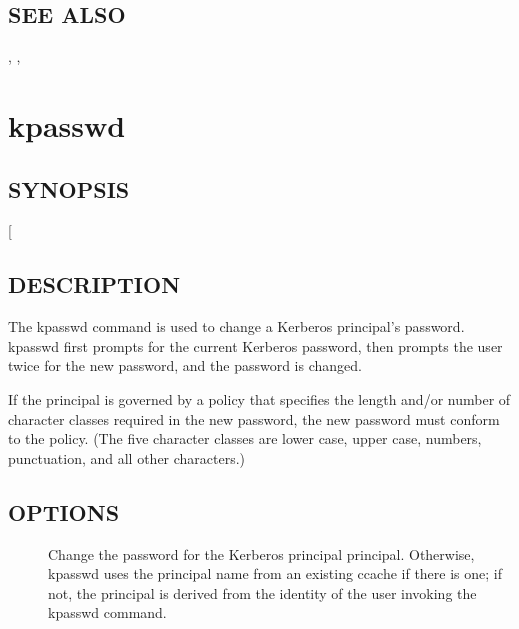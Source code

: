 \documentclass[letterpaper,10pt,english]{sphinxmanual}
\begin{document}
\subsection{SEE ALSO}
\label{\detokenize{user/user_commands/klist:see-also}}
{\hyperref[\detokenize{user/user_commands/kinit:kinit-1}]{}}, {\hyperref[\detokenize{user/user_commands/kdestroy:kdestroy-1}]{}}, {\hyperref[\detokenize{user/user_config/kerberos:kerberos-7}]{}}


\section{kpasswd}
\label{\detokenize{user/user_commands/kpasswd:kpasswd}}\label{\detokenize{user/user_commands/kpasswd::doc}}\label{\detokenize{user/user_commands/kpasswd:kpasswd-1}}

\subsection{SYNOPSIS}
\label{\detokenize{user/user_commands/kpasswd:synopsis}}
 {[}\sphinxstyleemphasis{principal}{]}


\subsection{DESCRIPTION}
\label{\detokenize{user/user_commands/kpasswd:description}}
The kpasswd command is used to change a Kerberos principal’s password.
kpasswd first prompts for the current Kerberos password, then prompts
the user twice for the new password, and the password is changed.

If the principal is governed by a policy that specifies the length
and/or number of character classes required in the new password, the
new password must conform to the policy.  (The five character classes
are lower case, upper case, numbers, punctuation, and all other
characters.)


\subsection{OPTIONS}
\label{\detokenize{user/user_commands/kpasswd:options}}\begin{description}
\item[{}] \leavevmode
Change the password for the Kerberos principal principal.
Otherwise, kpasswd uses the principal name from an existing ccache
if there is one; if not, the principal is derived from the
identity of the user invoking the kpasswd command.

\end{description}
\end{document}

